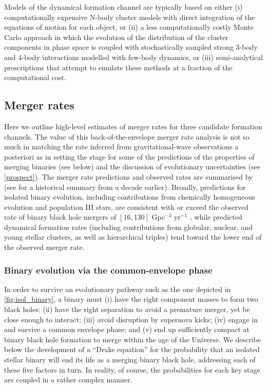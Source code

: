 \documentclass[review]{elsarticle}
\begin{document}
Models of the dynamical formation channel are typically based on either (i) computationally expensive N-body cluster models with direct integration of the equations of motion for each object, or (ii) a less computationally costly Monte Carlo approach in which the evolution of the distribution of the cluster components in phase space is coupled with stochastically sampled strong 3-body and 4-body interactions modelled with few-body dynamics, or (iii) semi-analytical prescriptions that attempt to emulate these methods at a fraction of the computational cost. 

\subsection{Merger rates}

Here we outline high-level estimates of merger rates for three candidate formation channels. The value of this back-of-the-envelope merger rate analysis is not so much in matching the rate inferred from gravitational-wave observations a posteriori as in setting the stage for some of the predictions of the properties of merging binaries (see below) and the discussion of evolutionary uncertainties (see \autoref{prospect}).  The merger rate predictions and observed rates are summarised by \cite{MandelBroekgaarden:2021} (see \cite{ratesdoc} for a historical summary from a decade earlier).  Broadly, predictions for isolated binary evolution, including contributions from chemically homogeneous evolution and population III stars, are consistent with or exceed the observed rate of binary black hole mergers of $[16,130]$ Gpc$^{-3}$ yr$^{-1}$ \citep{GWTC3:pop}, while predicted dynamical formation rates (including contributions from globular, nuclear, and young stellar clusters, as well as hierarchical triples) tend toward the lower end of the observed merger rate.

\subsubsection{Binary evolution via the common-envelope phase}\label{sec:CErates}

In order to survive an evolutionary pathway such as the one depicted in \autoref{fig:isol_binary}, a binary must (i) have the right component masses to form two black holes; (ii) have the right separation to avoid a premature merger, yet be close enough to interact; (iii) avoid disruption by supernova kicks; (iv) engage in and survive a common envelope phase; and (v) end up sufficiently compact at binary black hole formation to merge within the age of the Universe. We describe below the development of a ``Drake equation'' for the probability that an isolated stellar binary will end its life as a merging binary black hole, addressing each of these five factors in turn.   In reality, of course, the probabilities for each key stage are coupled in a rather complex manner.
\end{document}
